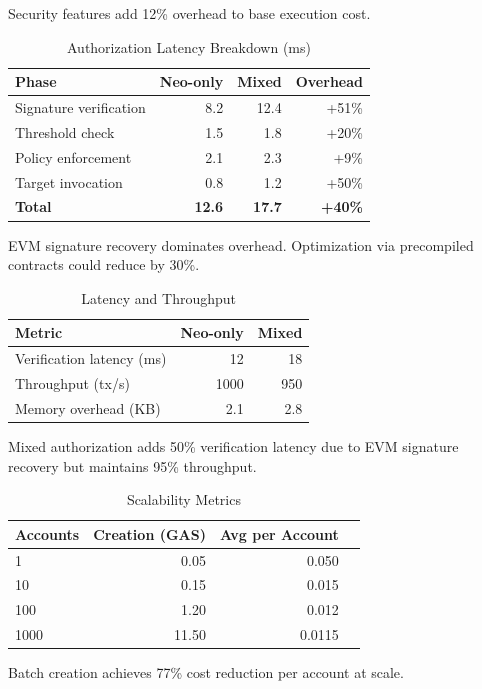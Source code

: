 \documentclass[10pt,twocolumn]{article}
\begin{document}
Security features add 12\% overhead to base execution cost.


\begin{table}[h]
\centering
\caption{Authorization Latency Breakdown (ms)}
\begin{tabular}{@{}lrrr@{}}
\toprule
Phase & Neo-only & Mixed & Overhead \\\midrule
Signature verification & 8.2 & 12.4 & +51\% \\
Threshold check & 1.5 & 1.8 & +20\% \\
Policy enforcement & 2.1 & 2.3 & +9\% \\
Target invocation & 0.8 & 1.2 & +50\% \\
\textbf{Total} & \textbf{12.6} & \textbf{17.7} & \textbf{+40\%} \\
\bottomrule
\end{tabular}
\end{table}

EVM signature recovery dominates overhead. Optimization via precompiled contracts could reduce by 30\%.


\begin{table}[h]
\centering
\caption{Latency and Throughput}
\begin{tabular}{@{}lrr@{}}
\toprule
Metric & Neo-only & Mixed \\\midrule
Verification latency (ms) & 12 & 18 \\
Throughput (tx/s) & 1000 & 950 \\
Memory overhead (KB) & 2.1 & 2.8 \\
\bottomrule
\end{tabular}
\end{table}

Mixed authorization adds 50\% verification latency due to EVM signature recovery but maintains 95\% throughput.


\begin{table}[h]
\centering
\caption{Scalability Metrics}
\begin{tabular}{@{}lrrr@{}}
\toprule
Accounts & Creation (GAS) & Avg per Account \\\midrule
1 & 0.05 & 0.050 \\
10 & 0.15 & 0.015 \\
100 & 1.20 & 0.012 \\
1000 & 11.50 & 0.0115 \\
\bottomrule
\end{tabular}
\end{table}

Batch creation achieves 77\% cost reduction per account at scale.
\end{document}
